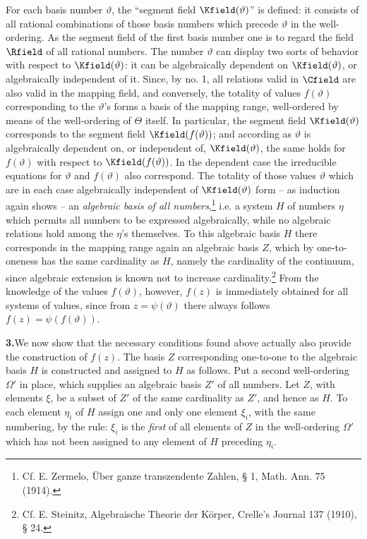 \documentclass[11pt]{article}
\begin{document}
For each basis number \(\vartheta\), the ``segment field \(\Kfield(\vartheta)\)'' is defined: it consists of all rational combinations of those basis numbers which precede \(\vartheta\) in the well-ordering. As the segment field of the first basis number one is to regard the field \(\Rfield\) of all rational numbers. The number \(\vartheta\) can display two sorts of behavior with respect to \(\Kfield(\vartheta)\): it can be algebraically dependent on \(\Kfield(\vartheta)\), or algebraically independent of it. Since, by no. 1, all relations valid in \(\Cfield\) are also valid in the mapping field, and conversely, the totality of values \(f(\vartheta)\) corresponding to the \(\vartheta\)'s forms a basis of the mapping range, well-ordered by means of the well-ordering of \(\Theta\) itself. In particular, the segment field \(\Kfield(\vartheta)\) corresponds to the segment field \(\Kfield(f(\vartheta))\); and according as \(\vartheta\) is algebraically dependent on, or independent of, \(\Kfield(\vartheta)\), the same holds for \(f(\vartheta)\) with respect to \(\Kfield(f(\vartheta))\). In the dependent case the irreducible equations for \(\vartheta\) and \(f(\vartheta)\) also correspond. The totality of those values \(\vartheta\) which are in each case algebraically independent of \(\Kfield(\vartheta)\) form -- as induction again shows -- an \emph{algebraic basis of all numbers},\footnote{Cf. E. Zermelo, Über ganze transzendente Zahlen, § 1, Math. Ann. 75 (1914).} i.e. a system \(H\) of numbers \(\eta\) which permits all numbers to be expressed algebraically, while no algebraic relations hold among the \(\eta\)'s themselves. To this algebraic basis \(H\) there corresponds in the mapping range again an algebraic basis \(Z\), which by one-to-oneness has the same cardinality as \(H\), namely the cardinality of the continuum, since algebraic extension is known not to increase cardinality.\footnote{Cf. E. Steinitz, Algebraische Theorie der Körper, Crelle's Journal 137 (1910), § 24.} From the knowledge of the values \(f(\vartheta)\), however, \(f(z)\) is immediately obtained for all systems of values, since from \(z=\psi(\vartheta)\) there always follows \(f(z)=\psi(f(\vartheta))\).

\medskip
\noindent\textbf{3.}\quad We now show that the necessary conditions found above actually also provide the construction of \(f(z)\). The basis \(Z\) corresponding one-to-one to the algebraic basis \(H\) is constructed and assigned to \(H\) as follows. Put a second well-ordering \(\Omega'\) in place, which supplies an algebraic basis \(Z'\) of all numbers. Let \(Z\), with elements \(\xi\), be a subset of \(Z'\) of the same cardinality as \(Z'\), and hence as \(H\). To each element \(\eta_i\) of \(H\) assign one and only one element \(\xi_i\), with the same numbering, by the rule: \(\xi_i\) is the \emph{first} of all elements of \(Z\) in the well-ordering \(\Omega'\) which has not been assigned to any element of \(H\) preceding \(\eta_i\).
\end{document}

